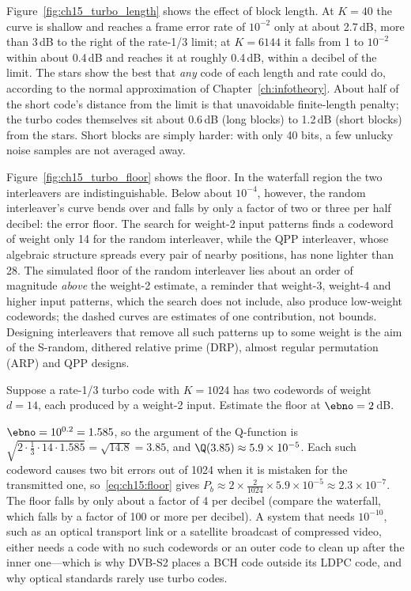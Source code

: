 Figure~\ref{fig:ch15_turbo_length} shows the effect of block length. At $K=40$ the curve is
shallow and reaches a frame error rate of $10^{-2}$ only at about 2.7\,dB, more than 3\,dB to the
right of the rate-1/3 limit; at $K=6144$ it falls from 1 to $10^{-2}$ within about 0.4\,dB and
reaches it at roughly 0.4\,dB, within a decibel of the limit. The stars show the best that
\emph{any} code of each length and rate could do, according to the normal approximation of
Chapter~\ref{ch:infotheory}. About half of the short code's distance from the limit is that
unavoidable finite-length penalty; the turbo codes themselves sit about 0.6\,dB (long blocks) to
1.2\,dB (short blocks) from the stars. Short blocks are simply harder: with only 40 bits, a few
unlucky noise samples are not averaged away.

Figure~\ref{fig:ch15_turbo_floor} shows the floor. In the waterfall region the two interleavers
are indistinguishable. Below about $10^{-4}$, however, the random interleaver's curve bends over and
falls by only a factor of two or three per half decibel: the error floor. The search for weight-2
input patterns finds a codeword of weight only 14 for the random interleaver, while the QPP
interleaver, whose algebraic structure spreads every pair of nearby positions, has none lighter than
28. The simulated floor of the random interleaver lies about an order of magnitude \emph{above} the
weight-2 estimate, a reminder that weight-3, weight-4 and higher input patterns, which the search
does not include, also produce low-weight codewords; the dashed curves are estimates of one
contribution, not bounds. Designing interleavers that remove all such patterns up to some weight is
the aim of the S-random, dithered relative prime (DRP), almost regular permutation (ARP) and QPP
designs.

\begin{worked}
Suppose a rate-1/3 turbo code with $K=1024$ has two codewords of weight $d=14$, each produced by a
weight-2 input. Estimate the floor at $\ebno=2$\,dB.

$\ebno=10^{0.2}=1.585$, so the argument of the Q-function is
$\sqrt{2\cdot\frac13\cdot14\cdot1.585}=\sqrt{14.8}=3.85$, and $\Q(3.85)\approx5.9\times10^{-5}$.
Each such codeword causes two bit errors out of 1024 when it is mistaken for the transmitted one,
so~\eqref{eq:ch15:floor} gives
$P_b\approx2\times\frac{2}{1024}\times5.9\times10^{-5}\approx2.3\times10^{-7}$.
The floor falls by only about a factor of 4 per decibel (compare the waterfall, which falls by a
factor of 100 or more per decibel). A system that needs $10^{-10}$, such as an optical transport
link or a satellite broadcast of compressed video, either needs a code with no such codewords or an
outer code to clean up after the inner one---which is why DVB-S2 places a BCH code outside its LDPC
code, and why optical standards rarely use turbo codes.
\end{worked}

